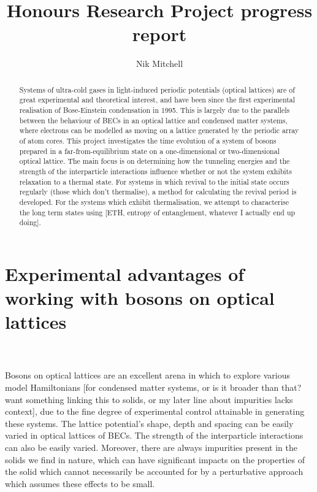 \documentclass[a4paper,10pt]{article}
\title{Honours Research Project progress report}
\author{Nik Mitchell}
\begin{document}
\maketitle

\begin{abstract}

Systems of ultra-cold gases in light-induced periodic potentials (optical lattices) are of great experimental and theoretical interest, and have been since the first experimental 
realisation of Bose-Einstein condensation in 1995. 
This is largely due to the parallels between the behaviour of BECs in an optical lattice and condensed matter systems, where 
electrons can be modelled as moving on a lattice generated by the periodic array of atom cores\cite{Bloch2012}. This project 
investigates the time evolution of a system of bosons prepared in a far-from-equilibrium state on a one-dimensional or two-dimensional
optical lattice. The main focus is on determining how the tunneling energies and the strength of the interparticle interactions influence
whether or not the system exhibits relaxation to a thermal state. For systems in which revival to the initial state occurs regularly (those which don't thermalise), 
a method for calculating the revival period is developed. For the systems which exhibit thermalisation, we attempt to characterise the long term
states using [ETH, entropy of entanglement, whatever I actually end up doing].




\end{abstract}
\newpage
\section{Experimental advantages of working with bosons on optical lattices}
\\\\
Bosons on optical lattices are an excellent arena in which to explore various model Hamiltonians [for condensed matter systems, or is it broader than that?
want something linking this to solids, or my later line about impurities lacks context], due to the 
fine degree of experimental control attainable in generating these systems.
The lattice potential's shape, depth and spacing can be easily varied in optical lattices of BECs\cite{Morsch2006}. 
The strength of the interparticle interactions can also be easily varied. 
Moreover, there are always impurities present in the solids we find in nature,
which can have significant impacts on the properties of the solid which cannot necessarily be accounted for by a perturbative approach which assumes these effects 
to be small. %
\end{document}
